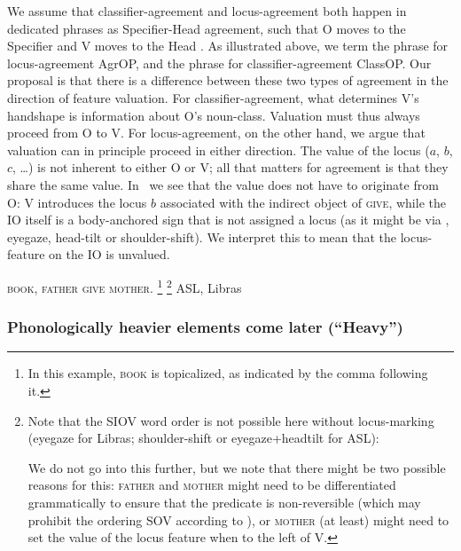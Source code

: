 \documentclass[output=paper]{langscibook}
\begin{document}
We assume that classifier-agreement and locus-agreement both
happen in dedicated phrases as Specifier-Head agreement, such that O
moves to the Specifier and V moves to the Head \citep{Benedicto.Brentari.2004,Kuhn.2016}. 
As illustrated above, we term the phrase
for locus-agreement AgrOP, and the phrase for classifier-agreement
ClassOP. Our proposal is that there is a difference between these two types
of agreement in the direction of feature valuation. For
classifier-agreement, what determines V’s handshape is information
about O’s noun-class. Valuation must thus always proceed from O to
V. For locus-agreement, on the other hand, we argue that valuation can
in principle proceed in either direction. The value of the locus ($a$, $b$, $c$,
\ldots) is not inherent to either O or V; all that matters for agreement is
that they share the same value. In~ we see that the value does not
have to originate from O: V introduces the locus $b$ associated with the
indirect object of \textsc{give}, while the IO itself is a body-anchored sign
that is not assigned a locus (as it might be via , eyegaze, head-tilt or
shoulder-shift). We interpret this to mean that the locus-feature on the
IO is unvalued.

\ea 
    \label{lasz:ex:12}
    \textsc{book}, \textsc{father} \textsc{give} \textsc{mother}.%
    \footnote{%
        In this example, \textsc{book} is topicalized, as indicated by the comma
        following it.
    }%
    \footnote{%
        Note that the SIOV word order is not possible here without locus-marking
        (eyegaze for Libras; shoulder-shift or eyegaze+headtilt for ASL):
        \begin{exe}  \end{exe}
        We do not go into this further, but we note that there might be two possible reasons
        for this: \textsc{father} and \textsc{mother} might need to be differentiated grammatically to
        ensure that the predicate is non-reversible (which may prohibit the ordering SOV
        according to \citealp{Fischer.1974}), or \textsc{mother} (at least) might need to set the value of the
        locus feature when to the left of V.
    }
    \hfill 
    \cmark ASL,
    \cmark Libras 
    \\
\z 

\subsubsection{Phonologically heavier elements come later (``Heavy'')}
\end{document}
